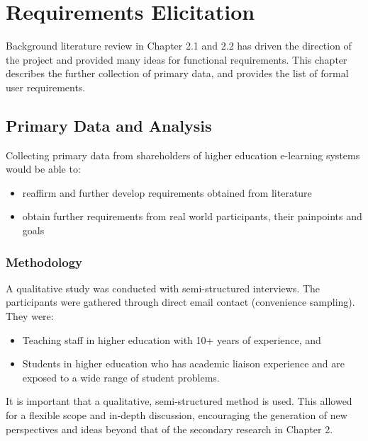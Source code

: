 \chapter{Requirements Elicitation}
\graphicspath{{Chapter4/Figs/Raster/}{Chapter4/Figs/}}

Background literature review in Chapter 2.1 and 2.2 has driven the direction of the project and
provided many ideas for functional requirements. This chapter describes the further collection of primary
data, and provides the list of formal user requirements.

\section{Primary Data and Analysis}
Collecting primary data from shareholders of higher education e-learning systems would be able to:
\begin{itemize}
	\setlength\itemsep{0em}	
	\item reaffirm and further develop requirements obtained from literature
	\item obtain further requirements from real world participants, their painpoints and goals
\end{itemize}

\subsection{Methodology}

A qualitative study was conducted with semi-structured interviews. 
The participants were gathered through direct email contact (convenience sampling). 
They were:
\begin{itemize}
	\setlength\itemsep{0em}	
	\item Teaching staff in higher education with 10+ years of experience, and
	\item Students in higher education who has academic liaison experience and are exposed to a wide range of student problems.
\end{itemize}

It is important that a qualitative, semi-structured method is used. 
This allowed for a flexible scope and in-depth discussion, encouraging 
the generation of new perspectives and ideas beyond that of the secondary research in Chapter 2.

